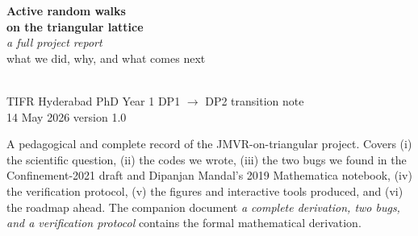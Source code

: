 \documentclass[11pt,a4paper]{article}
\newcommand{\veps}[1]{\hat{\mathbf{e}}_{#1}}
\begin{document}
\thispagestyle{empty}
\vspace*{1.5cm}
\begin{center}


\vspace{1.4cm}
{\bfseries\color{accent}\fontsize{36}{40}\selectfont Active random walks}\\[3mm]
{\bfseries\color{accent}\fontsize{30}{34}\selectfont on the triangular lattice}\\[8mm]
{\Large\itshape\color{neutral} a full project report}\\[3mm]
{\large\color{neutral} what we did, why, and what comes next}\\[20mm]

\\[2mm]
{\small\color{neutral} TIFR Hyderabad \;\textbar\; PhD Year 1 \;\textbar\; DP1 $\to$ DP2 transition note}\\[20mm]

{\small\color{neutral} 14 May 2026 \;\textbar\; version 1.0}

\vfill
\begin{tcolorbox}[enhanced, sharp corners, width=0.92\linewidth,
  colback=keyfill, colframe=accent, boxrule=0pt, leftrule=3pt,
  fonttitle=\bfseries\color{accent}, title=What this document is]
\small
A pedagogical and complete record of the JMVR-on-triangular project.
Covers (i) the scientific question, (ii) the codes we wrote, (iii) the
two bugs we found in the Confinement-2021 draft and Dipanjan Mandal's
2019 Mathematica notebook, (iv) the verification protocol, (v) the
figures and interactive tools produced, and (vi) the roadmap ahead.
The companion document
\emph{a complete derivation, two bugs, and a verification protocol}
contains the formal mathematical derivation.
\end{tcolorbox}
\end{center}
\vspace{4mm}
\newpage
\end{document}
